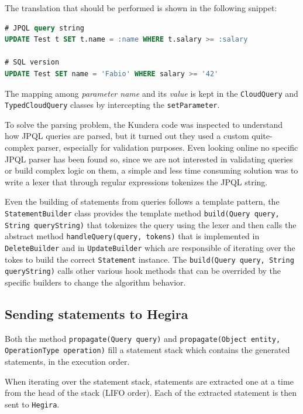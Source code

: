 \noindent The translation that should be performed is shown in the following snippet:

\begin{lstlisting}[language=SQL, caption=JPQL to SQL translation, label=code:query-translation, numbers=none]
# JPQL query string
UPDATE Test t SET t.name = :name WHERE t.salary >= :salary

# SQL version
UPDATE Test SET name = 'Fabio' WHERE salary >= '42'
\end{lstlisting} 

\noindent The mapping among \textit{parameter name} and its \textit{value} is kept in the \texttt{CloudQuery} and \texttt{TypedCloudQuery} classes by intercepting the \texttt{setParameter}.

\newparagraph To solve the parsing problem, the Kundera code was inspected to understand how JPQL queries are parsed, but it turned out they used a custom quite-complex parser, especially for validation purposes. Even looking online no specific JPQL parser has been found so, since we are not interested in validating queries or build complex logic on them, a simple and less time consuming solution was to write a lexer that through regular expressions tokenizes the JPQL string.

\noindent Even the building of statements from queries follows a template pattern, the \texttt{StatementBuilder} class provides the template method \texttt{build(Query query, String queryString)} that tokenizes the query using the lexer and then calls the abstract method \texttt{handleQuery(query, tokens)} that is implemented in \texttt{DeleteBuilder} and in \texttt{UpdateBuilder} which are responsible of iterating over the tokes to build the correct \texttt{Statement} instance.
The \texttt{build(Query query, String queryString)} calls other various hook methods that can be overrided by the specific builders to change the algorithm behavior.

\subsection{Sending statements to Hegira}
Both the method \texttt{propagate(Query query)} and \texttt{propagate(Object entity, OperationType operation)} fill a statement stack which contains the generated statements, in the execution order.

\noindent When iterating over the statement stack, statements are extracted one at a time from the head of the stack (LIFO order). Each of the extracted statement is then sent to \texttt{Hegira}.

